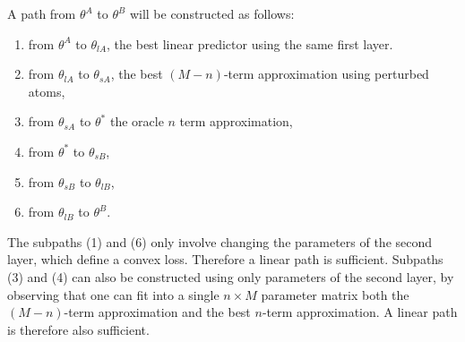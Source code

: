 A path from $\theta^A$ to $\theta^B$ will be constructed 
as follows:
\begin{enumerate}
\item from $\theta^A$ to $\theta_{lA}$, the 
best linear predictor using the same first layer. 
\item from $\theta_{lA}$ to $\theta_{sA}$, the best $(M-n)$-term approximation using perturbed 
atoms, 
\item from $\theta_{sA}$ to $\theta^*$ the oracle $n$ term approximation,  
\item from $\theta^*$ to $\theta_{sB}$,
\item from $\theta_{sB}$ to $\theta_{lB}$,
\item from $\theta_{lB}$ to $\theta^{B}$.
\end{enumerate}
The subpaths (1) and (6) only involve changing the parameters of the second layer, 
which define a convex loss. Therefore a linear path is sufficient.
Subpaths (3) and (4) can also be constructed using only parameters of the second layer, 
by observing that one can fit into a single $n \times M$ parameter matrix both the 
$(M-n)$-term approximation and the best $n$-term approximation. A linear path is therefore 
also sufficient. 

